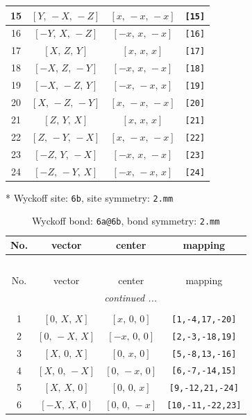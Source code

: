 \documentclass[fleqn,8pt]{jsarticle}
\begin{document}
\begin{longtable}{cccc}
15 & $\left[ Y,\, - X,\, - Z \right]$ & $\left[ x,\, - x,\, - x \right]$ & {\tt [15]} \\ \hline
16 & $\left[ - Y,\, X,\, - Z \right]$ & $\left[ - x,\, x,\, - x \right]$ & {\tt [16]} \\ \hline
17 & $\left[ X,\, Z,\, Y \right]$ & $\left[ x,\, x,\, x \right]$ & {\tt [17]} \\ \hline
18 & $\left[ - X,\, Z,\, - Y \right]$ & $\left[ - x,\, x,\, - x \right]$ & {\tt [18]} \\ \hline
19 & $\left[ - X,\, - Z,\, Y \right]$ & $\left[ - x,\, - x,\, x \right]$ & {\tt [19]} \\ \hline
20 & $\left[ X,\, - Z,\, - Y \right]$ & $\left[ x,\, - x,\, - x \right]$ & {\tt [20]} \\ \hline
21 & $\left[ Z,\, Y,\, X \right]$ & $\left[ x,\, x,\, x \right]$ & {\tt [21]} \\ \hline
22 & $\left[ Z,\, - Y,\, - X \right]$ & $\left[ x,\, - x,\, - x \right]$ & {\tt [22]} \\ \hline
23 & $\left[ - Z,\, Y,\, - X \right]$ & $\left[ - x,\, x,\, - x \right]$ & {\tt [23]} \\ \hline
24 & $\left[ - Z,\, - Y,\, X \right]$ & $\left[ - x,\, - x,\, x \right]$ & {\tt [24]} \\
\end{longtable}
* Wyckoff site: {\tt 6b}, site symmetry: {\tt 2.mm}
\renewcommand{\arraystretch}{1.2}
\begin{longtable}{cccc}
\caption{Wyckoff bond: {\tt 6a@6b}, bond symmetry: {\tt 2.mm}}
 \\
 \hline \hline
No. & vector & center & mapping \\ \hline \endfirsthead

\multicolumn{3}{l}{\tablename\ \thetable{}} \\
 \hline \hline
No. & vector & center & mapping \\ \hline \endhead

 \hline \hline
\multicolumn{3}{r}{\footnotesize\it continued ...} \\ \endfoot

 \hline \hline
\multicolumn{3}{r}{} \\ \endlastfoot

1 & $\left[ 0,\, X,\, X \right]$ & $\left[ x,\, 0,\, 0 \right]$ & {\tt [1,-4,17,-20]} \\ \hline
2 & $\left[ 0,\, - X,\, X \right]$ & $\left[ - x,\, 0,\, 0 \right]$ & {\tt [2,-3,-18,19]} \\ \hline
3 & $\left[ X,\, 0,\, X \right]$ & $\left[ 0,\, x,\, 0 \right]$ & {\tt [5,-8,13,-16]} \\ \hline
4 & $\left[ X,\, 0,\, - X \right]$ & $\left[ 0,\, - x,\, 0 \right]$ & {\tt [6,-7,-14,15]} \\ \hline
5 & $\left[ X,\, X,\, 0 \right]$ & $\left[ 0,\, 0,\, x \right]$ & {\tt [9,-12,21,-24]} \\ \hline
6 & $\left[ - X,\, X,\, 0 \right]$ & $\left[ 0,\, 0,\, - x \right]$ & {\tt [10,-11,-22,23]} \\
\end{longtable}
\end{document}
